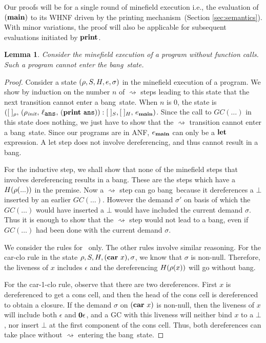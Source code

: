 \documentclass[9pt,nonatbib]{sigplanconf}
\newcommand{\bang}{\mbox{\sc bang}}
\newtheorem{lemma}[theorem]{Lemma}
\begin{document}
Our proofs will be for a single round of minefield execution i.e., the
evaluation  of  $(\mathbf{main})$  to  its  WHNF  driven  by  the  printing
mechanism~(Section \ref{sec:semantics}).   With minor  variations, the
proof will also be applicable  for subsequent evaluations initiated by
$\mathbf{print}$.
%
\begin{lemma}
\label{lemma:call-less-cannot-go-bang}
Consider the minefield execution of  a program without function calls.
Such a program cannot enter the \bang\ state.
\end{lemma}
\begin{proof}
Consider a  state  $(\rho,  S,  H,  e, \sigma)$  in  the
minefield execution of a program.  We  show by induction on the number $n$
of $\rightsquigarrow$ steps  leading to  this state  that the next  transition cannot
enter a  \bang\ state.   When $n$  is 0,  the state  is $([\;]_\rho,\,
(\rho_\mathit{init},   \,  \ell_{\mathbf{\mbox{\tt ans}}}   ,\,  (\mathbf{print}~\mathbf{\mbox{\tt ans}})):[\;]_{S},
[\;]_{H},\, e_{\mathbf{main}})$.   Since the call  to $GC(\ldots)$ in  this state
does  nothing,  we  just  have to  show  that  the  $\rightsquigarrow$
transition cannot  enter a  \bang\ state.  Since  our programs  are in
ANF, $e_{\mathbf{main}}$ can only be a $\mbox{$\mathbf{ let}$}$ expression.  A {\sc let} step
does not involve dereferencing, and thus cannot result in a \bang.

For the inductive step, we shall show that none of the minefield steps
that involves dereferencing  results in a \bang.  These  are the steps
which   have   a   $H(\rho(...))$   in   the   premise.    Now   a
$\rightsquigarrow$ step can go \bang\ because it dereferences a $\bot$
inserted by an earlier $GC(\ldots)$.   However the demand $\sigma'$  on basis of
which the $GC(\ldots)$ would have inserted a  $\bot$ would have
included the  current demand $\sigma$.     Thus it is
enough to  show that the $\rightsquigarrow$ step would not lead to a
\bang, even if $GC(\ldots)$ had been done with the current demand
$\sigma$.

We consider the rules for \CAR\  only.  
The other rules involve similar reasoning. For the {\sc
  car-clo}  rule in  the state  $\rho, S,  H, (\mbox{$\mathbf{car}$}~x),
\sigma$, we  know that $\sigma$ is  non-null. Therefore,
the  liveness  of  $x$  includes  $\epsilon$  and  the
dereferencing $H(\rho(x))$ will go without \bang.

For the  {\sc car-1-clo}  rule, observe that  there are
two dereferences.  First $x$  is dereferenced to  get a
cons  cell,  and then  the  head  of  the cons  cell  is
dereferenced  to  obtain  a  closure.   If  the  demand
$\sigma$ on  $(\mbox{$\mathbf{car}$}~x)$ is non-null, then  the liveness
of    $x$   will    include    both   $\epsilon$    and
$\mathbf{0}\epsilon$,  and  a  GC with  this  liveness  will
neither bind $x$ to a  $\bot$, nor insert $\bot$ at the
first   component  of   the   cons   cell.  Thus,   both
dereferences    can take place without 
$\rightsquigarrow$ entering the   \bang\ state.
\end{proof} 
\end{document}

